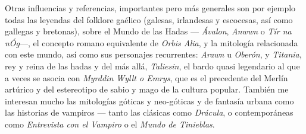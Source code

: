\documentclass[twoside]{article}
\begin{document}
\begin{multicols}{2}
  Otras influencias y referencias, importantes pero más generales son por
  ejemplo todas las leyendas del folklore gaélico (galesas, irlandesas y
  escocesas, así como gallegas y bretonas), sobre el Mundo de las Hadas ---
  \emph{Ávalon}, \emph{Anwwn} o \emph{Tír na nÓg}---, el concepto romano
  equivalente de \emph{Orbis Alia}, y la mitología relacionada con este
  mundo, así como sus personajes recurrentes: \emph{Arawn} u
  \emph{Oberón}, y \emph{Titania}, rey y reina de las hadas y del más allá, \emph{Taliesin}, 
  el bardo quasi legendario al que a veces se asocia con \emph{Myrddin Wyllt o Emrys}, que 
  es el precedente del Merlín artúrico y del estereotipo de sabio y mago de la cultura 
  popular. También me interesan mucho las mitologías góticas y neo-góticas y de fantasía 
  urbana como las
  historias de vampiros --- tanto las clásicas como \emph{Drácula}\autocite*{stoker}, o 
  contemporáneas como \emph{Entrevista con el Vampiro}\autocite*{rice1994} o el \emph{Mundo 
  de Tinieblas}\autocite*{achilli2016}.
  
\end{multicols}
\end{document}
